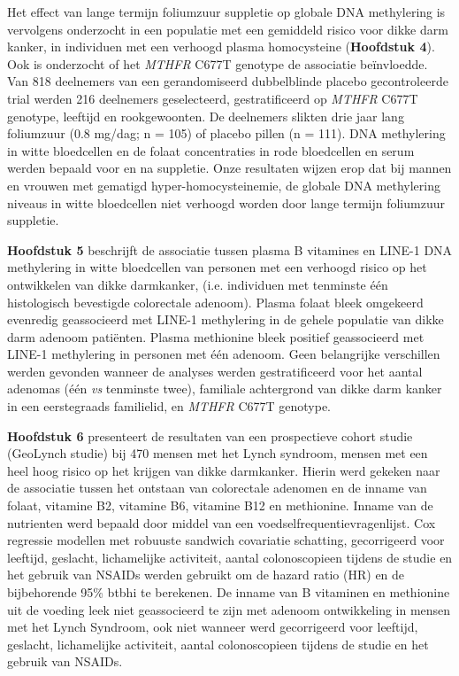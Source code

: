 \noindent Het effect van lange termijn foliumzuur suppletie op globale DNA methylering is vervolgens onderzocht in een populatie met een gemiddeld risico voor dikke darm kanker, in individuen met een verhoogd plasma homocysteine (\textbf{Hoofdstuk 4}). Ook is onderzocht of het \emph{MTHFR} C677T genotype de associatie be\"invloedde. Van 818 deelnemers van een gerandomiseerd dubbelblinde placebo gecontroleerde trial werden 216 deelnemers geselecteerd, gestratificeerd op \emph{MTHFR} C677T genotype, leeftijd en rookgewoonten. De deelnemers slikten drie jaar lang foliumzuur (0.8 mg/dag; n = 105) of placebo pillen (n = 111). DNA methylering in witte bloedcellen en de folaat concentraties in rode bloedcellen en serum werden bepaald voor en na suppletie. Onze resultaten wijzen erop dat bij mannen en vrouwen met gematigd hyper-homocysteinemie, de globale DNA methylering niveaus in witte bloedcellen niet verhoogd worden door lange termijn foliumzuur suppletie.

\noindent \textbf{Hoofdstuk 5} beschrijft de associatie tussen plasma B vitamines en LINE-1 DNA methylering in witte bloedcellen van personen met een verhoogd risico op het ontwikkelen van dikke darmkanker, (i.e. individuen met tenminste \'e\'en histologisch bevestigde colorectale adenoom). Plasma folaat bleek omgekeerd evenredig geassocieerd met LINE-1 methylering in de gehele populatie van dikke darm adenoom pati\"enten. Plasma methionine bleek positief geassocieerd met LINE-1 methylering in personen met \'e\'en adenoom. Geen belangrijke verschillen werden gevonden wanneer de analyses werden gestratificeerd voor het aantal adenomas (\'e\'en \emph{vs} tenminste twee), familiale achtergrond van dikke darm kanker in een eerstegraads familielid, en \emph{MTHFR} C677T genotype.

\noindent \textbf{Hoofdstuk 6} presenteert de resultaten van  een prospectieve cohort studie (GeoLynch studie) bij 470 mensen met het Lynch syndroom, mensen met een heel hoog risico op het krijgen van dikke darmkanker. Hierin werd gekeken naar de associatie tussen het ontstaan van colorectale adenomen en de inname van folaat, vitamine B2, vitamine B6, vitamine B12 en methionine. Inname van de nutrienten werd bepaald door middel van een voedselfrequentievragenlijst. Cox regressie modellen met robuuste sandwich covariatie schatting, gecorrigeerd voor leeftijd, geslacht, lichamelijke activiteit, aantal colonoscopieen tijdens de studie en het gebruik van NSAIDs werden gebruikt om de hazard ratio (HR) en de bijbehorende 95\% btbhi te berekenen. De inname van B vitaminen en methionine uit de voeding leek niet geassocieerd te zijn met adenoom ontwikkeling in mensen met het Lynch Syndroom, ook niet wanneer werd gecorrigeerd voor leeftijd, geslacht, lichamelijke activiteit, aantal colonoscopieen tijdens de studie en het gebruik van NSAIDs.

